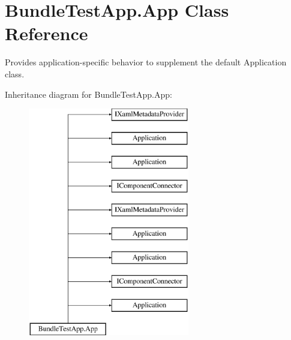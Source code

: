 \section{Bundle\+Test\+App.\+App Class Reference}
\label{class_bundle_test_app_1_1_app}


Provides application-\/specific behavior to supplement the default Application class.  


Inheritance diagram for Bundle\+Test\+App.\+App\+:\begin{figure}[H]
\begin{center}
\leavevmode
\includegraphics[height=10.000000cm]{class_bundle_test_app_1_1_app}
\end{center}
\end{figure}
